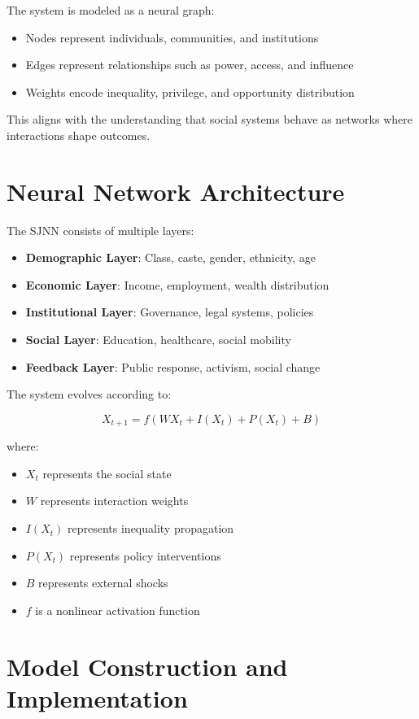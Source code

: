 \documentclass[12pt]{article}
\begin{document}
The system is modeled as a neural graph:

\begin{itemize}
\item Nodes represent individuals, communities, and institutions
\item Edges represent relationships such as power, access, and influence
\item Weights encode inequality, privilege, and opportunity distribution
\end{itemize}

This aligns with the understanding that social systems behave as networks where interactions shape outcomes.

\section{Neural Network Architecture}

The SJNN consists of multiple layers:

\begin{itemize}
\item \textbf{Demographic Layer}: Class, caste, gender, ethnicity, age
\item \textbf{Economic Layer}: Income, employment, wealth distribution
\item \textbf{Institutional Layer}: Governance, legal systems, policies
\item \textbf{Social Layer}: Education, healthcare, social mobility
\item \textbf{Feedback Layer}: Public response, activism, social change
\end{itemize}

The system evolves according to:

\[
X_{t+1} = f(WX_t + I(X_t) + P(X_t) + B)
\]

where:
\begin{itemize}
\item $X_t$ represents the social state
\item $W$ represents interaction weights
\item $I(X_t)$ represents inequality propagation
\item $P(X_t)$ represents policy interventions
\item $B$ represents external shocks
\item $f$ is a nonlinear activation function
\end{itemize}

\section{Model Construction and Implementation}
\end{document}
